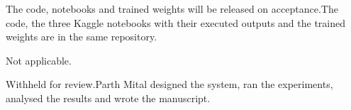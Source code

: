 \documentclass[pdflatex,sn-mathphys-num,iicol]{sn-jnl}
\begin{document}
 \ifdefined\Anonymised The code, notebooks and trained weights will be released on acceptance.\else The code, the three Kaggle notebooks with their executed outputs and the trained weights are in the same repository.\fi

 Not applicable.

 \ifdefined\Anonymised Withheld for review.\else Parth Mital designed the system, ran the experiments, analysed the results and wrote the manuscript.\fi

\ifdefined\NoReferences\else
{}
\fi

\end{document}

